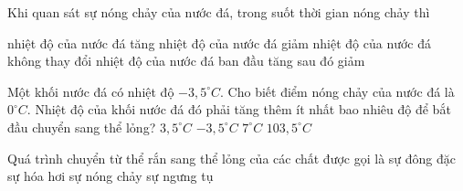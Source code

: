 \begin{ex}
	Khi quan sát sự nóng chảy của nước đá, trong suốt thời gian nóng chảy thì
	
	\choice
	{nhiệt độ của nước đá tăng}
	{nhiệt độ của nước đá giảm}
	{\True nhiệt độ của nước đá không thay đổi}
	{nhiệt độ của nước đá ban đầu tăng sau đó giảm}
	\loigiai{
		
	}
	\end{ex}

\begin{ex}
	Một khối nước đá có nhiệt độ $-3,5^\circ C$. Cho biết điểm nóng chảy của nước đá là $0^\circ C$. Nhiệt độ của khối nước đá đó phải tăng thêm ít nhất bao nhiêu độ để bắt đầu chuyển sang thể lỏng? 
	\choice
	{\True $3,5^\circ C$}
	{$-3,5^\circ C$}
	{$7^\circ C$}
	{$103,5^\circ C$}
	\end{ex}








\begin{ex} 
	Quá trình chuyển từ thể rắn sang thể lỏng của các chất được gọi là
	\choice
	{sự đông đặc}
	{sự hóa hơi}
	{\True sự nóng chảy}
	{sự ngưng tụ}
\end{ex}


